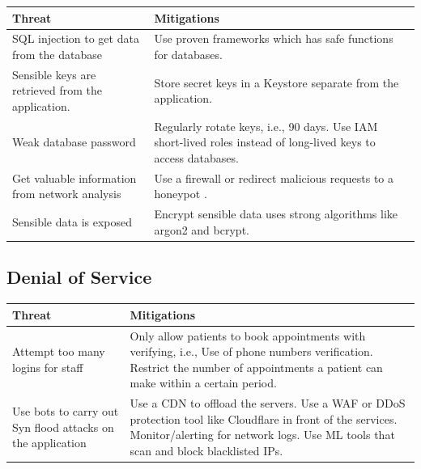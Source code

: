 \begingroup
\centering
\setlength{\tabcolsep}{6.5pt} %
\renewcommand{\arraystretch}{1.8} %
\begin{longtable}{ |p{7cm}| p{8cm} |}
\hline
\textbf{Threat} & \textbf{Mitigations}\\
\hline
SQL injection to get data from the database & Use proven frameworks which has safe functions for databases.\\
\hline
Sensible keys are retrieved from the application. & Store secret keys in a Keystore separate from the application.\\
\hline
Weak database password &  Regularly rotate keys, i.e., 90 days. \newline
Use IAM short-lived roles instead of long-lived keys to access databases. \\
\hline
Get valuable information from network analysis & Use a firewall or redirect malicious requests to a honeypot \citep{manageengine}.\\
\hline
Sensible data is exposed & Encrypt sensible data uses strong algorithms like argon2 and bcrypt. \citep{owasp_secure_encrypt}\\
\hline
\end{longtable}
\endgroup


\subsection{Denial of Service}
\begingroup
\centering
\setlength{\tabcolsep}{6.5pt} %
\renewcommand{\arraystretch}{1.8} %
\begin{longtable}{ |p{7cm}| p{8cm} |}
\hline
\textbf{Threat} & \textbf{Mitigations} \\
\hline
Attempt too many logins for staff & Only allow patients to book appointments with verifying, i.e., Use of phone numbers verification. \newline
Restrict the number of appointments a patient can make within a certain period.\\
\hline
Use bots to carry out Syn flood attacks on the application & Use a CDN to offload the servers.\newline 
Use a WAF or DDoS protection tool like Cloudflare in front of the services.\newline
Monitor/alerting for network logs.\newline
Use ML tools that scan and block blacklisted IPs.
\\
\hline
\end{longtable}
\endgroup


